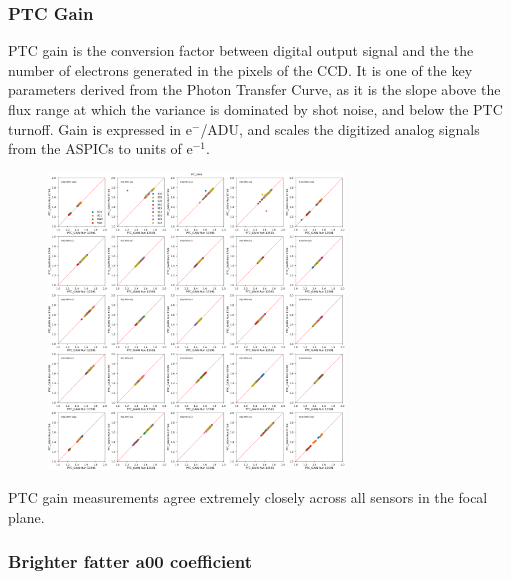 \subsubsection{PTC Gain}\label{ptc-gain}

PTC gain is the conversion factor between digital output signal and the the number of electrons generated in the pixels of the CCD. It is one of the key parameters derived from the Photon Transfer
Curve, as it is the slope above the flux range at which the variance is dominated by shot
noise, and below the PTC turnoff. Gain is expressed in e$^-$/ADU, and scales the digitized analog signals from the ASPICs to units of e$^{-1}$.

\begin{figure}[H]
\begin{centering}
\includegraphics[width=0.7\textwidth]{figures/baselineCharacterization/13591_E749_PTC_GAIN.png}
\end{centering}
\end{figure}

PTC gain measurements agree extremely closely across all sensors in the
focal plane.

\subsubsection{\texorpdfstring{Brighter fatter a{00}
coefficient}{Brighter fatter a00 coefficient}}\label{brighter-fatter-a00-coefficient}


